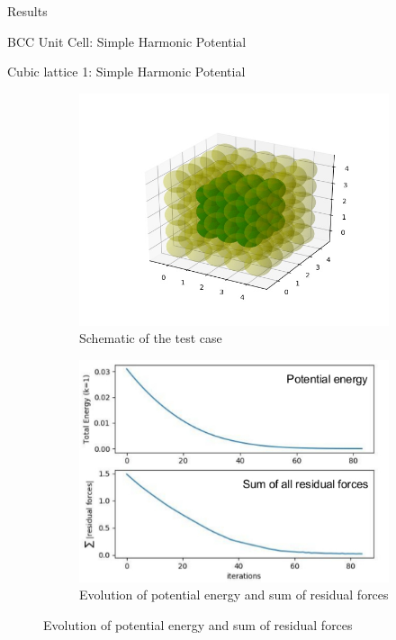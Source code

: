 \documentclass[12pt]{article}
\begin{document}
\begin{section}{Results}
\begin{subsection}{BCC Unit Cell: Simple Harmonic Potential}
\end{subsection}

\begin{subsection}{Cubic lattice 1: Simple Harmonic Potential}
\begin{figure}[h!]
    \begin{subfigure}{0.5\textwidth}
        \includegraphics[width=\linewidth]{images/5x5x5_model.jpg}
        \caption{Schematic of the test case}
        \label{fig:sub1}
    \end{subfigure}
    \begin{subfigure}{0.5\textwidth}
        \includegraphics[width=\linewidth]{images/5by5by5_UandF.jpeg}
        \caption{Evolution of potential energy and sum of residual forces}
        \label{fig:sub2}

\end{subfigure}
\end{figure}
\end{subsection}
\end{section}
\end{document}
